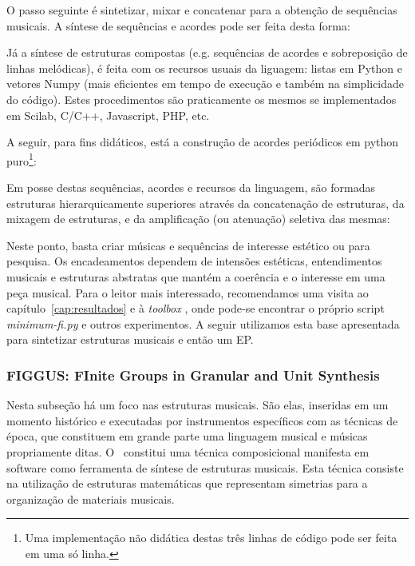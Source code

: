O passo seguinte é sintetizar, mixar e concatenar para a obtenção 
de sequências musicais. A síntese de sequências e acordes
pode ser feita desta forma:


Já a síntese de estruturas compostas (e.g. sequências de acordes e sobreposição
de linhas melódicas), é feita com os recursos usuais da liguagem:
listas em Python e vetores Numpy (mais eficientes em tempo de
execução e também na simplicidade do código). Estes 
procedimentos são praticamente os mesmos se implementados em Scilab, C/C++, Javascript, PHP, etc.

A seguir, para fins didáticos, está a construção de acordes periódicos em
python puro\footnote{Uma implementação não didática destas três linhas de código
pode ser feita em uma só linha.}:


Em posse destas sequências, acordes e recursos da linguagem,
são formadas estruturas hierarquicamente superiores
através da concatenação de estruturas, da mixagem de estruturas, e da amplificação
(ou atenuação) seletiva das mesmas:


Neste ponto, basta criar músicas e sequências de interesse estético ou para pesquisa. Os encadeamentos dependem de intensões estéticas, entendimentos musicais e estruturas abstratas que mantém a coerência e o interesse em uma peça musical. Para o leitor mais interessado, recomendamos uma visita ao capítulo~\ref{cap:resultados} e à \emph{toolbox} \massa, onde pode-se encontrar o próprio script \emph{minimum-fi.py} e outros experimentos. 
A seguir utilizamos esta base apresentada para sintetizar estruturas musicais e então um EP.

\vspace{10 mm}

\subsubsection{FIGGUS: FInite Groups in Granular and Unit Synthesis}

Nesta subseção há um foco nas estruturas musicais.
São elas, inseridas em um momento histórico e
executadas por instrumentos específicos com as técnicas de época,
que constituem em grande parte uma linguagem musical e músicas propriamente
ditas. O \figgus\ constitui uma técnica composicional
manifesta em software como ferramenta de síntese de
estruturas musicais. Esta técnica
consiste na utilização de estruturas matemáticas
que representam simetrias para a organização de materiais musicais.


